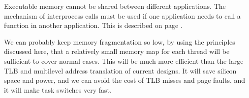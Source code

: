 \documentclass[forwardcom.tex]{subfiles}
\begin{document}
Executable memory cannot be shared between different applications. The mechanism of interprocess calls must be used if one application needs to call a function in another application. This is described on page \pageref{interProcessCalls}. 
\vspace{2mm}

We can probably keep memory fragmentation so low, by using the principles discussed here, that a relatively small memory map for each thread will be sufficient to cover normal cases. This will be much more efficient than the large TLB and multilevel address translation of current designs. It will save silicon space and power, and we can avoid the cost of TLB misses and page faults, and it will make task switches very fast.
\end{document}
